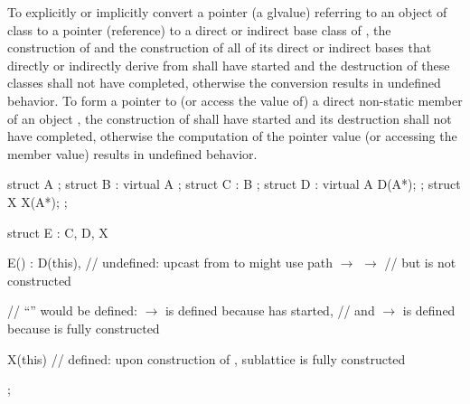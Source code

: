 \pnum
{}%
%
To explicitly or implicitly convert a pointer (a glvalue) referring to
an object of class
to a pointer (reference) to a direct or indirect base class
of
,
the construction of
and the construction of all of its direct or indirect bases that directly or
indirectly derive from
shall have started and the destruction of these classes shall not have
completed, otherwise the conversion results in undefined behavior.
To form a pointer to (or access the value of) a direct non-static member of
an object
,
the construction of
shall have started and its destruction shall not have completed,
otherwise the computation of the pointer value (or accessing the member
value) results in undefined behavior.
\begin{example}
\begin{codeblock}
struct A { };
struct B : virtual A { };
struct C : B { };
struct D : virtual A { D(A*); };
struct X { X(A*); };

struct E : C, D, X {
  E() : D(this),    // undefined: upcast from  to  might use path  $\rightarrow$  $\rightarrow$ 
                    // but  is not constructed

                    // ``\!'' would be defined:  $\rightarrow$  is defined because  has started,
                    // and  $\rightarrow$  is defined because  is fully constructed

  X(this) {}        // defined: upon construction of ,  sublattice is fully constructed
};
\end{codeblock}
\end{example}


